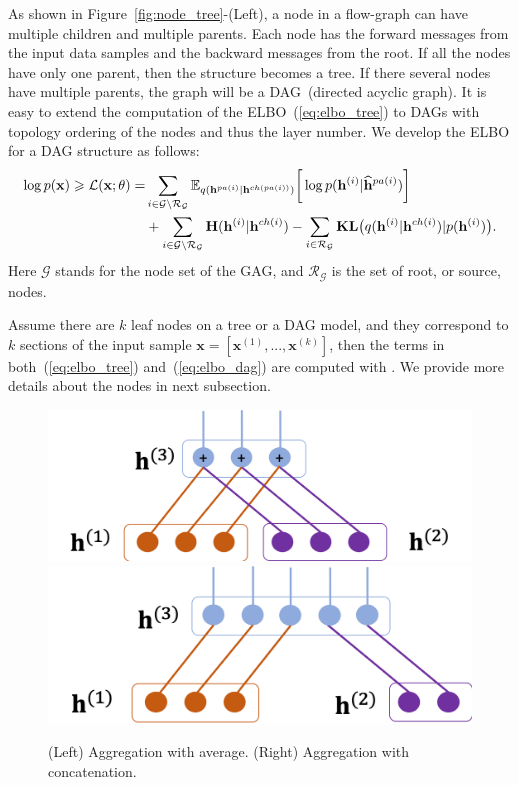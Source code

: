 \documentclass{article} %
\newcommand{\belhal}[1]{{\color{red}{\bf\sf [BK: #1]}}}
\begin{document}
As shown in Figure~\ref{fig:node_tree}-(Left), a node in a flow-graph can have multiple children and multiple parents.
Each node has the forward messages from the input data samples and the backward messages from the root.  
If all the nodes have only one parent, then the structure becomes a tree. 
If there several nodes have multiple parents, the graph will be a DAG~(directed acyclic graph). 
It is easy to extend the computation of the ELBO~(\ref{eq:elbo_tree}) to DAGs with topology ordering  of the nodes and thus the layer number. 
We develop the ELBO for a DAG structure as follows:
\begin{align}  \notag
 \log p(\mathbf{x}) \geqslant \mathcal{L}(\mathbf{x}; \theta) 
= &  \sum_{i \in \mathcal{G}  \setminus  \mathcal{R}_{ \mathcal{G} }  }  \mathbb{E}_{q(\mathbf{h}^{pa(i)}|\mathbf{h}^{ch(pa(i))})} \bigg[ \log p( \mathbf{h}^{(i)}|  \widehat{\mathbf{h}}^{pa(i)})   \bigg]\\
 & +  \sum_{i \in \mathcal{G}  \setminus  \mathcal{R}_{ \mathcal{G} }  } \textbf{\text{H}}(\mathbf{h}^{(i)} | \mathbf{h}^{ch(i)} )   -    \sum_{i \in  \mathcal{R}_{ \mathcal{G} }  }  \textbf{\text{KL}}\big(q(\mathbf{h}^{(i)} | \mathbf{h}^{ch(i)} )   | p(\mathbf{h}^{(i)})  \big) . \label{eq:elbo_dag}
 \end{align}
Here $\mathcal{G}$ stands for the node set of the GAG, and $\mathcal{R}_{ \mathcal{G}}$ is the set of root, or source, nodes. 

Assume there are $k$ leaf nodes on a tree or a DAG model, and they correspond to $k$ sections of the input sample $\mathbf{x} = [\mathbf{x}^{(1)}, ..., \mathbf{x}^{(k)}]$, then the terms in both~(\ref{eq:elbo_tree}) and~(\ref{eq:elbo_dag}) are computed with . 
\belhal{incomplete sentence, what did you want to say here?}
We provide more details about the nodes in next subsection.
 
\begin{figure}[!htbp] %
\begin{center}
 \includegraphics[width=0.43\linewidth]{fig/node_aggre_sum.png}
 \includegraphics[width=0.43\linewidth]{fig/node_aggre_cat.png}
\end{center}
   \caption{(Left) Aggregation with average. (Right) Aggregation with concatenation. }
\label{fig:node_aggre}
\end{figure}
\end{document}
